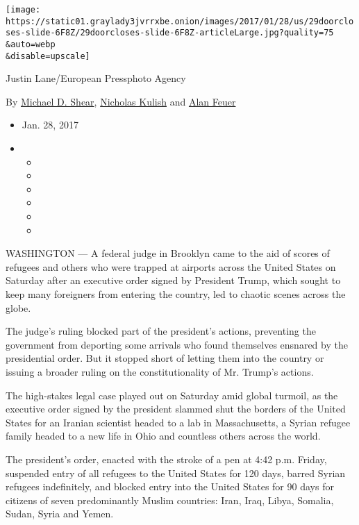 \texttt{[image: https://static01.graylady3jvrrxbe.onion/images/2017/01/28/us/29doorcloses-slide-6F8Z/29doorcloses-slide-6F8Z-articleLarge.jpg?quality=75\\\&auto=webp\\\&disable=upscale]}

Justin Lane/European Pressphoto Agency

By \href{http://www.nytimes3xbfgragh.onion/by/michael-d-shear}{Michael
D. Shear},
\href{http://www.nytimes3xbfgragh.onion/by/nicholas-kulish}{Nicholas
Kulish} and \href{http://www.nytimes3xbfgragh.onion/by/alan-feuer}{Alan
Feuer}

\begin{itemize}
\item
  Jan. 28, 2017
\item
  \begin{itemize}
  \item
  \item
  \item
  \item
  \item
  \item
  \end{itemize}
\end{itemize}

WASHINGTON --- A federal judge in Brooklyn came to the aid of scores of
refugees and others who were trapped at airports across the United
States on Saturday after an executive order signed by President Trump,
which sought to keep many foreigners from entering the country, led to
chaotic scenes across the globe.

The judge's ruling blocked part of the president's actions, preventing
the government from deporting some arrivals who found themselves
ensnared by the presidential order. But it stopped short of letting them
into the country or issuing a broader ruling on the constitutionality of
Mr. Trump's actions.

The high-stakes legal case played out on Saturday amid global turmoil,
as the executive order signed by the president slammed shut the borders
of the United States for an Iranian scientist headed to a lab in
Massachusetts, a Syrian refugee family headed to a new life in Ohio and
countless others across the world.

The president's order, enacted with the stroke of a pen at 4:42 p.m.
Friday, suspended entry of all refugees to the United States for 120
days, barred Syrian refugees indefinitely, and blocked entry into the
United States for 90 days for citizens of seven predominantly Muslim
countries: Iran, Iraq, Libya, Somalia, Sudan, Syria and Yemen.

